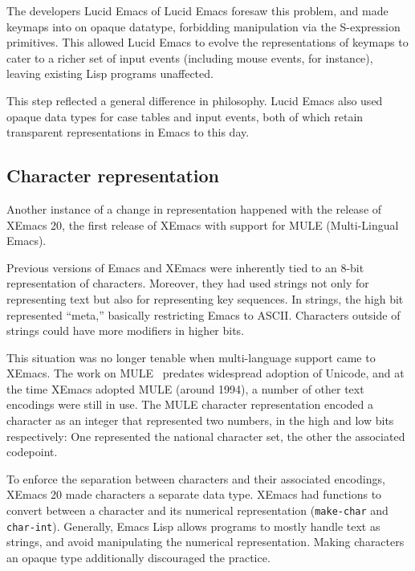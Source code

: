 \documentclass[format=acmsmall, review=false, screen=true]{acmart}
\begin{document}
The developers Lucid Emacs of Lucid Emacs foresaw this problem, and
made keymaps into on opaque datatype, forbidding manipulation via the
S-expression primitives.  This allowed Lucid Emacs to evolve the
representations of keymaps to cater to a richer set of input events
(including mouse events, for instance), leaving existing Lisp programs
unaffected.

This step reflected a general difference in philosophy.  Lucid Emacs
also used opaque data types for case tables and input events, both of
which retain transparent representations in Emacs to this day.

\subsection{Character representation}
\label{sec:character-representation}

Another instance of a change in representation happened with the
release of XEmacs 20, the first release of XEmacs with support for
MULE (Multi-Lingual Emacs).

Previous versions of Emacs and XEmacs were inherently tied to an 8-bit
representation of characters.  Moreover, they had used strings not
only for representing text but also for representing key sequences.
In strings, the high bit represented ``meta,'' basically restricting
Emacs to ASCII.  Characters outside of strings could have more
modifiers in higher bits.

This situation was no longer tenable when multi-language support came
to XEmacs.  The work on MULE~\cite{Ohmaki2002} predates widespread
adoption of Unicode, and at the time XEmacs adopted MULE (around
1994), a number of other text encodings were still in use.  The MULE
character representation encoded a character as an integer that
represented two numbers, in the high and low bits respectively: One
represented the national character set, the other the associated
codepoint.

To enforce the separation between characters and their associated
encodings, XEmacs 20 made characters a separate data type.  XEmacs had
functions to convert between a character and its numerical
representation (\texttt{make-char} and \texttt{char-int}).  Generally,
Emacs Lisp allows programs to mostly handle text as strings,
and avoid manipulating the numerical representation.  Making
characters an opaque type additionally discouraged the practice.

\end{document}
